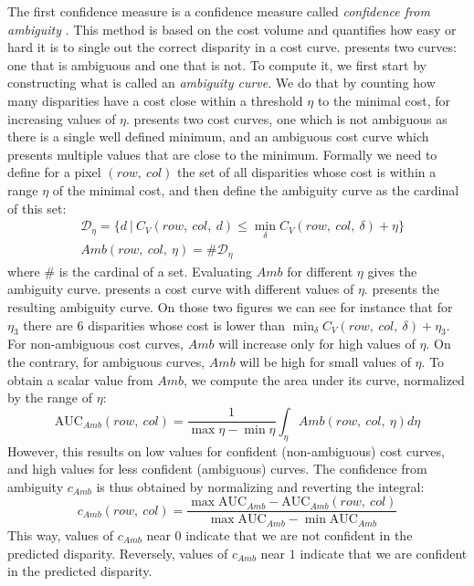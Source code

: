The first confidence measure is a confidence measure called \textit{confidence from ambiguity} \cite{sarrazin_ambiguity_2021}. This method is based on the cost volume and quantifies how easy or hard it is to single out the correct disparity in a cost curve.  presents two curves: one that is ambiguous and one that is not. To compute it, we first start by constructing what is called an \textit{ambiguity curve}. We do that by counting how many disparities have a cost close within a threshold $\eta$ to the minimal cost, for increasing values of $\eta$.  presents two cost curves, one which is not ambiguous as there is a single well defined minimum, and an ambiguous cost curve which presents multiple values that are close to the minimum. Formally we need to define for a pixel $(row, ~col)$ the set of all disparities whose cost is within a range $\eta$ of the minimal cost, and then define the ambiguity curve as the cardinal of this set:
\begin{align}
    &\mathcal{D}_\eta = \{d ~|~ C_V(row,~col,~d) \leqslant \min_\delta C_V(row, ~col, ~\delta) + \eta\}\\
    &Amb(row, ~col, ~\eta) = \#\mathcal{D}_\eta
\end{align}
where $\#$ is the cardinal of a set. Evaluating $Amb$ for different $\eta$ gives the ambiguity curve.  presents a cost curve with different values of $\eta$.  presents the resulting ambiguity curve. On those two figures we can see for instance that for $\eta_3$ there are $6$ disparities whose cost is lower than $\min_\delta C_V(row, ~col, ~\delta) + \eta_3$. For non-ambiguous cost curves, $Amb$ will increase only for high values of $\eta$. On the contrary, for ambiguous curves, $Amb$ will be high for small values of $\eta$. To obtain a scalar value from $Amb$, we compute the area under its curve, normalized by the range of $\eta$:
\begin{equation}
    \mathrm{AUC}_{Amb}(row, ~col) = \frac{1}{\max\eta-\min\eta}\int_\eta Amb(row,~col,~\eta)d\eta
\end{equation}
However, this results on low values for confident (non-ambiguous) cost curves, and high values for less confident (ambiguous) curves. The confidence from ambiguity $c_{Amb}$ is thus obtained by normalizing and reverting the integral:
\begin{equation}\label{eq:confidence_from_ambiguity}
    c_{Amb}(row, ~col) = \frac{\max \mathrm{AUC}_{Amb}- \mathrm{AUC}_{Amb}(row, ~col)}{\max \mathrm{AUC}_{Amb} -\min \mathrm{AUC}_{Amb}}
\end{equation}
This way, values of $c_{Amb}$ near $0$ indicate that we are not confident in the predicted disparity. Reversely, values of $c_{Amb}$ near $1$ indicate that we are confident in the predicted disparity.

